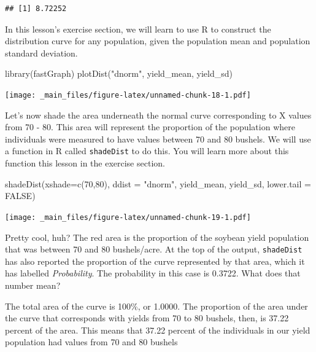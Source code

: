 \documentclass[
]{book}
\newenvironment{Shaded}{\begin{snugshade}}{\end{snugshade}}
\newcommand{\AttributeTok}[1]{\textcolor[rgb]{0.77,0.63,0.00}{#1}}
\newcommand{\ConstantTok}[1]{\textcolor[rgb]{0.00,0.00,0.00}{#1}}
\newcommand{\DecValTok}[1]{\textcolor[rgb]{0.00,0.00,0.81}{#1}}
\newcommand{\FunctionTok}[1]{\textcolor[rgb]{0.00,0.00,0.00}{#1}}
\newcommand{\NormalTok}[1]{#1}
\newcommand{\StringTok}[1]{\textcolor[rgb]{0.31,0.60,0.02}{#1}}
\begin{document}
\begin{verbatim}
## [1] 8.72252
\end{verbatim}

In this lesson's exercise section, we will learn to use R to construct the distribution curve for any population, given the population mean and population standard deviation.

\begin{Shaded}
\begin{Highlighting}[]
\FunctionTok{library}\NormalTok{(fastGraph)}
\FunctionTok{plotDist}\NormalTok{(}\StringTok{"dnorm"}\NormalTok{, yield\_mean, yield\_sd)}
\end{Highlighting}
\end{Shaded}

\texttt{[image: \_main\_files/figure-latex/unnamed-chunk-18-1.pdf]}

Let's now shade the area underneath the normal curve corresponding to X values from 70 - 80. This area will represent the proportion of the population where individuals were measured to have values between 70 and 80 bushels. We will use a function in R called \texttt{shadeDist} to do this. You will learn more about this function this lesson in the exercise section.

\begin{Shaded}
\begin{Highlighting}[]
\FunctionTok{shadeDist}\NormalTok{(}\AttributeTok{xshade=}\FunctionTok{c}\NormalTok{(}\DecValTok{70}\NormalTok{,}\DecValTok{80}\NormalTok{), }\AttributeTok{ddist =} \StringTok{"dnorm"}\NormalTok{, yield\_mean, yield\_sd, }\AttributeTok{lower.tail =} \ConstantTok{FALSE}\NormalTok{)}
\end{Highlighting}
\end{Shaded}

\texttt{[image: \_main\_files/figure-latex/unnamed-chunk-19-1.pdf]}

Pretty cool, huh? The red area is the proportion of the soybean yield population that was between 70 and 80 bushels/acre. At the top of the output, \texttt{shadeDist} has also reported the proportion of the curve represented by that area, which it has labelled \emph{Probability}. The probability in this case is 0.3722. What does that number mean?

The total area of the curve is 100\%, or 1.0000. The proportion of the area under the curve that corresponds with yields from 70 to 80 bushels, then, is 37.22 percent of the area. This means that 37.22 percent of the individuals in our yield population had values from 70 and 80 bushels
\end{document}
